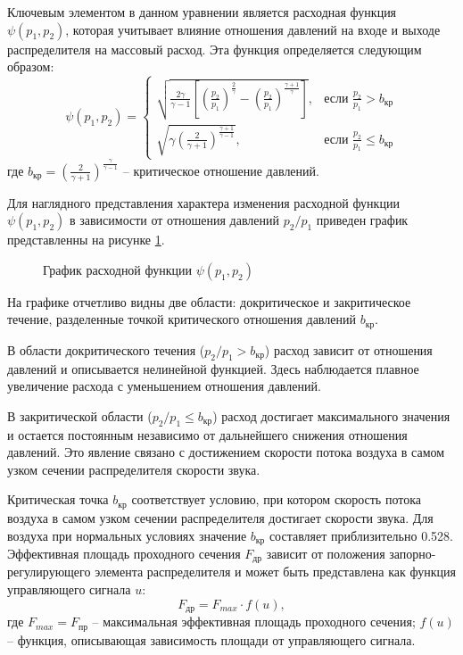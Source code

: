 Ключевым элементом в данном уравнении является расходная функция $\psi(p_1, p_2)$, которая
учитывает влияние отношения давлений на входе и выходе распределителя
на массовый расход. Эта функция определяется следующим образом:
\begin{equation*}
    \psi(p_1, p_2) = \begin{cases}
        \sqrt{\frac{2\gamma}{\gamma-1}\left[\left(\frac{p_2}{p_1}\right)^{\frac{2}{\gamma}} - \left(\frac{p_2}{p_1}\right)^{\frac{\gamma+1}{\gamma}}\right]}, & \text{если } \frac{p_2}{p_1} > b_{кр}    \\
        \sqrt{\gamma \left(\frac{2}{\gamma+1}\right)^{\frac{\gamma+1}{\gamma-1}}},                                                                            & \text{если } \frac{p_2}{p_1} \leq b_{кр}
    \end{cases}
\end{equation*}
где
$b_{кр} = \left(\frac{2}{\gamma+1}\right)^{\frac{\gamma}{\gamma-1}}$ -- критическое отношение давлений.

Для наглядного представления характера изменения расходной функции
$\psi(p_1, p_2)$ в зависимости от отношения давлений $p_2/p_1$
приведен график представленны на рисунке \ref{fig:ch2/mass_flow_function}.
\begin{figure}
    \caption{График расходной функции $\psi(p_1, p_2)$}
    \label{fig:ch2/mass_flow_function}
\end{figure}

На графике отчетливо видны две области: докритическое и закритическое течение, разделенные точкой
критического отношения давлений $b_{кр}$.

В области докритического течения ($p_2/p_1 > b_{кр}$) расход зависит от отношения давлений и
описывается нелинейной функцией. Здесь наблюдается плавное увеличение расхода с уменьшением отношения давлений.

В закритической области ($p_2/p_1 \leq b_{кр}$) расход достигает максимального
значения и остается постоянным независимо от дальнейшего снижения отношения давлений.
Это явление связано с достижением скорости потока воздуха
в самом узком сечении распределителя скорости звука.

Критическая точка $b_{кр}$ соответствует условию, при котором скорость потока
воздуха в самом узком сечении распределителя достигает скорости звука. Для
воздуха при нормальных условиях значение $b_{кр}$ составляет приблизительно \num{0.528}.
Эффективная площадь проходного сечения $F_\text{др}$ зависит от
положения запорно-регулирующего элемента распределителя и может
быть представлена как функция управляющего сигнала $u$:
\begin{equation*}
    F_\text{др} = F_{max} \cdot f(u),
\end{equation*}
где $F_{max} = F_\text{пр}$ -- максимальная эффективная площадь проходного сечения;
$f(u)$ -- функция, описывающая зависимость площади от управляющего сигнала.

